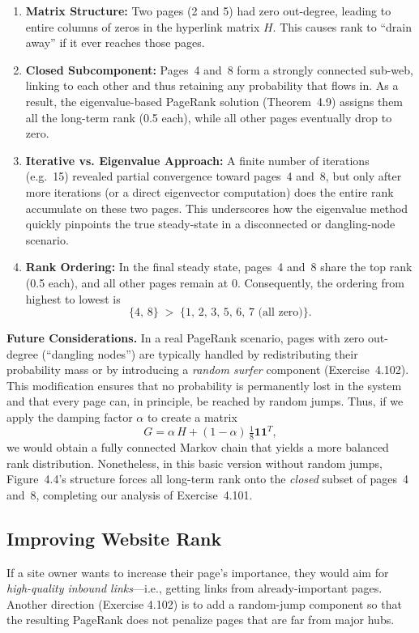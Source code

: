 \documentclass{article}
\begin{document}
\begin{enumerate}
  \item \textbf{Matrix Structure:} 
    Two pages (2 and 5) had zero out-degree, leading to entire columns of zeros in the 
    hyperlink matrix $H$. This causes rank to ``drain away'' if it ever reaches those pages.
  
  \item \textbf{Closed Subcomponent:} 
    Pages~4 and~8 form a strongly connected sub-web, linking to each other and thus 
    retaining any probability that flows in. As a result, the eigenvalue-based PageRank 
    solution (Theorem~4.9) assigns them all the long-term rank (0.5 each), while all 
    other pages eventually drop to zero.

  \item \textbf{Iterative vs. Eigenvalue Approach:} 
    A finite number of iterations (e.g.\ 15) revealed partial convergence toward pages~4 and~8, 
    but only after more iterations (or a direct eigenvector computation) does the entire rank 
    accumulate on these two pages. This underscores how the eigenvalue method quickly 
    pinpoints the true steady-state in a disconnected or dangling-node scenario.

  \item \textbf{Rank Ordering:} 
    In the final steady state, pages~4 and~8 share the top rank (0.5 each), and all other 
    pages remain at 0. Consequently, the ordering from highest to lowest is 
    \[
      \{4,\,8\} \;>\; \{1,\,2,\,3,\,5,\,6,\,7\text{ (all zero)}\}.
    \]
\end{enumerate}

\noindent
\textbf{Future Considerations.} 
In a real PageRank scenario, pages with zero out-degree (``dangling nodes'') are typically 
handled by redistributing their probability mass or by introducing a \emph{random surfer} 
component (Exercise~4.102). This modification ensures that no probability is permanently 
lost in the system and that every page can, in principle, be reached by random jumps. 
Thus, if we apply the damping factor $\alpha$ to create a matrix 
\[
G = \alpha\,H + (1-\alpha)\,\tfrac{1}{8}\mathbf{1}\mathbf{1}^T,
\]
we would obtain a fully connected Markov chain that yields a more balanced rank distribution.  
Nonetheless, in this basic version without random jumps, Figure~4.4's structure forces all 
long-term rank onto the \emph{closed} subset of pages~4 and~8, completing our analysis 
of Exercise~4.101.


\subsection*{Improving Website Rank}      
If a site owner wants to increase their page's importance, they would aim for \emph{high-quality inbound links}---i.e., 
getting links from already-important pages. Another direction (Exercise 4.102) is to add a random-jump component 
so that the resulting PageRank does not penalize pages that are far from major hubs.
\end{document}
